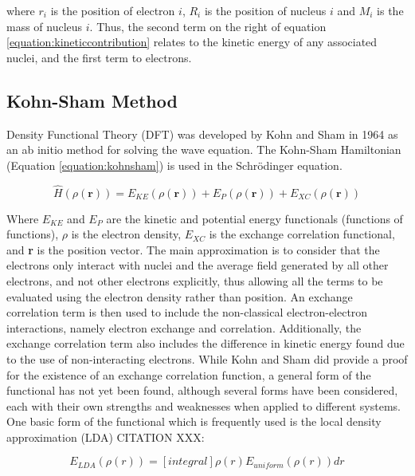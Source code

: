 where $r_{i}$ is the position of electron $i$, $R_{i}$ is the position of nucleus $i$ and $M_{i}$ is the mass of nucleus $i$. Thus, the second term on the right of equation \ref{equation:kineticcontribution} relates to the kinetic energy of any associated nuclei, and the first term to electrons.

\subsection{Kohn-Sham Method}

Density Functional Theory (DFT) was developed by Kohn and Sham in 1964 \cite{Kohn1965} as an ab initio method for solving the wave equation. The Kohn-Sham Hamiltonian (Equation \ref{equation:kohnsham}) is used in the Schr\"odinger equation.

\begin{equation}
\hat{H}(\rho(\textbf{r})) = E_{KE}(\rho(\textbf{r})) + E_{P}(\rho(\textbf{r})) + E_{XC}(\rho(\textbf{r}))
\label{equation:kohnsham}
\end{equation}

Where $E_{KE}$ and $E_{P}$ are the kinetic and potential energy functionals (functions of functions), $\rho$ is the electron density, $E_{XC}$ is the exchange correlation functional, and \textbf{r} is the position vector. The main approximation is to consider that the electrons only interact with nuclei and the average field generated by all other electrons, and not other electrons explicitly, thus allowing all the terms to be evaluated using the electron density rather than position. An exchange correlation term is then used to include the non-classical electron-electron interactions, namely electron exchange and correlation. Additionally, the exchange correlation term also includes the difference in kinetic energy found due to the use of non-interacting electrons. While Kohn and Sham did provide a proof for the existence of an exchange correlation function, a general form of the functional has not yet been found, although several forms have been considered, each with their own strengths and weaknesses when applied to different systems. One basic form of the functional which is frequently used is the local density approximation (LDA) CITATION XXX:

\begin{equation}
E_{LDA}(\rho(r)) = [integral]\rho(r)E_{uniform}(\rho(r))dr
\label{equation:LDA}
\end{equation}

